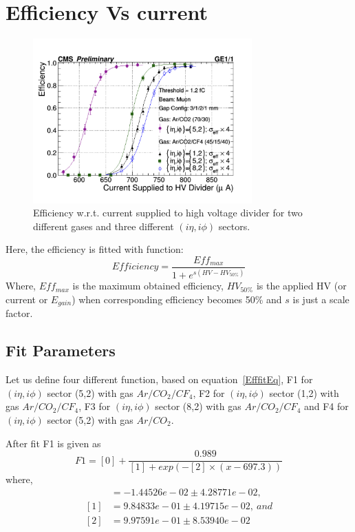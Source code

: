 \section{Efficiency Vs current} %
\label{sec:efficiency_vs_current}
\begin{figure}[!htbp]
\centering
\includegraphics[width=0.75\textwidth]{figures/GEM/Efficiency_Current.jpeg}
\caption{Efficiency w.r.t. current supplied to high voltage divider for two different gases and three different $(i\eta,i\phi)$ sectors.}
\label{Efficiency}
\end{figure}
Here, the efficiency is fitted with function:
\begin{equation}\label{EfffitEq}
    Efficiency = \frac{Eff_{max}}{1+e^{s(HV-HV_{50\%})}}
\end{equation}
Where, $Eff_{max}$ is the maximum obtained efficiency, $HV_{50\%}$ is the applied HV (or current or $E_{gain}$) when corresponding efficiency becomes 50\% and $s$ is just a scale factor.

\subsection{Fit Parameters} %
\label{sub:fit_parameters}
Let us define four different function, based on equation~\ref{EfffitEq}, F1 for $(i\eta,i\phi)$ sector (5,2) with gas $Ar/CO_2/CF_4$, F2 for $(i\eta,i\phi)$ sector (1,2) with gas $Ar/CO_2/CF_4$, F3 for $(i\eta,i\phi)$ sector (8,2) with gas $Ar/CO_2/CF_4$ and F4 for $(i\eta,i\phi)$ sector (5,2) with gas $Ar/CO_2$.

After fit F1 is given as
\begin{equation}
	F1 = [0] + \frac{0.989}{[1]+exp(-[2]\times(x-697.3))}
\end{equation}
where,
\begin{align*}
[0] &= -1.44526e-02 \pm 4.28771e-02,\\
[1] &= 9.84833e-01 \pm 4.19715e-02,~and \\
[2] &= 9.97591e-01 \pm 8.53940e-02
\end{align*}

